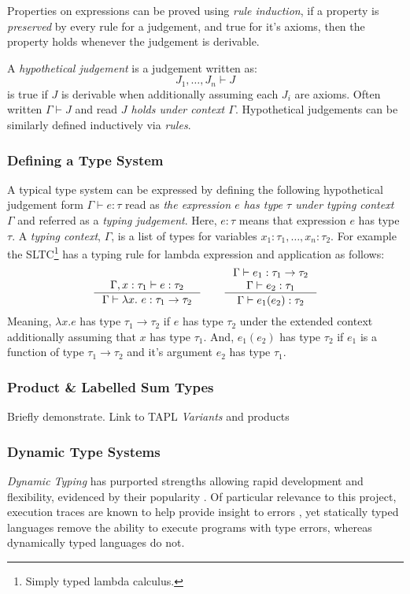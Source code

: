 Properties on expressions can be proved using \textit{rule induction}, if a property is \textit{preserved} by every rule for a judgement, and true for it's axioms, then the property holds whenever the judgement is derivable.

A \textit{hypothetical judgement} is a judgement written as: 
\[J_1, \dots, J_n \vdash J\]
is true if $J$ is derivable when additionally assuming each $J_i$ are axioms. Often written $\Gamma \vdash J$ and read \textit{$J$ holds under context $\Gamma$}. Hypothetical judgements can be similarly defined inductively via \textit{rules}.

\subsubsection{Defining a Type System}\label{sec:TypingJudgements}
A typical type system can be expressed by defining the following hypothetical judgement form $\Gamma \vdash e : \tau$ read as \textit{the expression $e$ has type $\tau$ under typing context $\Gamma$} and referred as a \textit{typing judgement}. Here, $e : \tau$ means that expression $e$ has type $\tau$.  A \textit{typing context}, $\Gamma$, is a list of types for variables $x_1 : \tau_1, \dots, x_n : \tau_2$. For example the SLTC\footnote{Simply typed lambda calculus.} \cite[ch. 9]{TAPL} has a typing rule for lambda expression and application as follows:
\[\inference{\Gamma, x : \tau_1 \vdash e : \tau_2}{\Gamma \vdash \lambda x.\ e : \tau_1 \to \tau_2} \qquad \inference{\Gamma \vdash e_1 : \tau_1 \to \tau_2\\ \Gamma \vdash e_2 : \tau_1}{\Gamma \vdash e_1(e_2) : \tau_2}\]
Meaning, $\lambda x. e$ has type $\tau_1 \to \tau_2$ if $e$ has type $\tau_2$ under the extended context additionally assuming that $x$ has type $\tau_1$.
And, $e_1(e_2)$ has type $\tau_2$ if $e_1$ is a function of type $\tau_1 \to \tau_2$ and it's argument $e_2$ has type $\tau_1$.

\subsubsection{Product \& Labelled Sum Types}\label{sec:ADTs}
Briefly demonstrate. Link to TAPL \textit{Variants} and products

\subsubsection{Dynamic Type Systems}\label{sec:DynamicTypeSystem}
\textit{Dynamic Typing} has purported strengths allowing rapid development and flexibility, evidenced by their popularity \cite{DynamicLangShift, TIOBE}. Of particular relevance to this project, execution traces are known to help provide insight to errors \cite{TraceVisualisation}, yet statically typed languages remove the ability to execute programs with type errors, whereas dynamically typed languages do not.\par 

